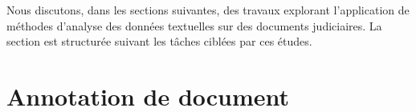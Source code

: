 




%
%
%
%


Nous discutons, dans les sections suivantes, des travaux explorant l'application de méthodes d'analyse des données textuelles sur des documents judiciaires. La section est structurée suivant les tâches ciblées par ces études.

\section{Annotation de document}

